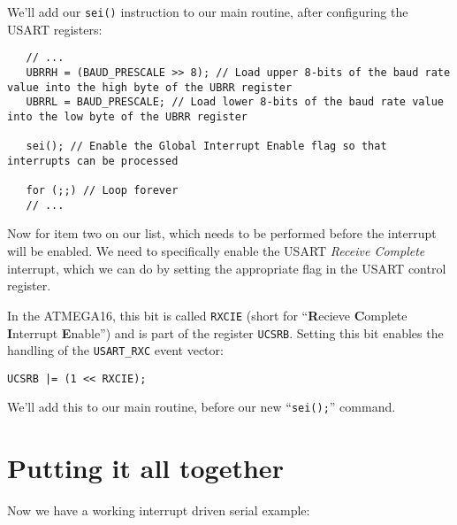 \documentclass[a4paper,oneside,notitlepage]{book}
\begin{document}
We'll add our \texttt{sei()} instruction to our main routine, after configuring the USART registers:

\begin{center}
\begin{lstlisting}
   // ...
   UBRRH = (BAUD_PRESCALE >> 8); // Load upper 8-bits of the baud rate value into the high byte of the UBRR register
   UBRRL = BAUD_PRESCALE; // Load lower 8-bits of the baud rate value into the low byte of the UBRR register

   sei(); // Enable the Global Interrupt Enable flag so that interrupts can be processed

   for (;;) // Loop forever
   // ...
\end{lstlisting}
\end{center}

Now for item two on our list, which needs to be performed before the interrupt will be enabled. We need to specifically enable the USART \emph{Receive Complete} interrupt, which we can do by setting the appropriate flag in the USART control register.

In the ATMEGA16, this bit is called \texttt{RXCIE} (short for ``\textbf{R}ecieve \textbf{C}omplete \textbf{I}nterrupt \textbf{E}nable'') and is part of the register \texttt{UCSRB}. Setting this bit enables the handling of the \texttt{USART\_RXC} event vector:

\begin{center}
\begin{lstlisting}
UCSRB |= (1 << RXCIE);
\end{lstlisting}
\end{center}

We'll add this to our main routine, before our new ``\texttt{sei();}'' command.


\chapter{Putting it all together}

Now we have a working interrupt driven serial example:
\end{document}
